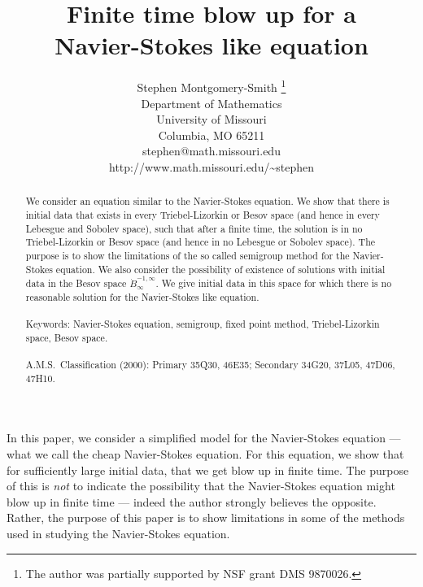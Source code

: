 \documentclass[12pt]{article}
\begin{document}
\title{
Finite time blow up for a\\
Navier-Stokes like equation
}

\author{%
Stephen Montgomery-Smith%
\thanks{
The author was 
partially supported
by NSF grant DMS 9870026.}
\\
Department of Mathematics\\
University of Missouri\\
Columbia, MO 65211\\
stephen@math.missouri.edu\\
http://www.math.missouri.edu/\~{}stephen
}


\date{}

\maketitle

\begin{abstract}
\noindent
We consider an equation similar to the Navier-Stokes equation.  
We show that
there is initial data that exists in every Triebel-Lizorkin or Besov space
(and hence in every Lebesgue and Sobolev space), such that after a finite
time, the solution
is in no Triebel-Lizorkin or Besov space (and hence 
in no Lebesgue or Sobolev space).  The purpose is to show the
limitations of the so called semigroup method for the Navier-Stokes
equation.
We also consider the possibility of existence of
solutions with initial data in the Besov space $\dot B^{-1,\infty}_\infty$.
We give initial data in this space for which there is no reasonable
solution for the Navier-Stokes like equation.
\\
\\
Keywords:
Navier-Stokes equation, semigroup, fixed point method,
Triebel-Lizorkin space, Besov space.
\\
\\
A.M.S.\ Classification (2000): Primary 35Q30, 46E35; Secondary 34G20, 37L05,
47D06, 47H10.
\end{abstract}

\noindent
In this paper, we consider a simplified model for the 
Navier-Stokes equation --- what we call the cheap Navier-Stokes
equation.  For this equation, we show that for sufficiently
large initial data, that we get blow up in finite time.  
The purpose of this is {\em not\/} to indicate the 
possibility that the Navier-Stokes equation might blow up
in finite time --- indeed the author strongly believes
the opposite.  Rather, the purpose of this paper is to show limitations
in some of the methods used in studying the Navier-Stokes
equation.
\end{document}
